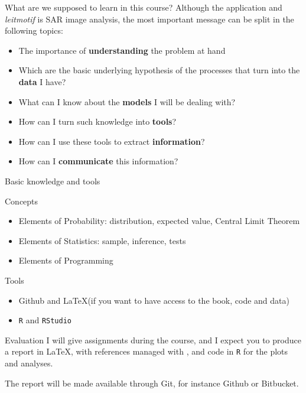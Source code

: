 \documentclass{beamer}
\begin{document}
\begin{frame}{What are we supposed to learn in this course?}
Although the application and \textit{leitmotif} is SAR image analysis, the most important message can be split in the following topics:
\begin{itemize}
\item The importance of \textbf{understanding} the problem at hand
\item Which are the basic underlying hypothesis of the processes that turn into the \textbf{data} I have?
\item What can I know about the \textbf{models} I will be dealing with?
\item How can I turn such knowledge into \textbf{tools}?
\item How can I use these tools to extract \textbf{information}?
\item How can I \textbf{communicate} this information?
\end{itemize}
\end{frame}

\begin{frame}{Basic knowledge and tools}

\begin{alertblock}{Concepts}
\begin{itemize}
\item Elements of Probability: distribution, expected value, Central Limit Theorem
\item Elements of Statistics: sample, inference, tests
\item Elements of Programming
\end{itemize}
\end{alertblock}

\begin{alertblock}{Tools}
\begin{itemize}
\item Github and \LaTeX (if you want to have access to the book, code and data)
\item \texttt R and \texttt{RStudio}
\end{itemize}
\end{alertblock}
\end{frame}

\begin{frame}{Evaluation}
I will give assignments during the course, and I expect you to produce a report in \LaTeX, with references managed with \BibTeX, and code in \texttt R for the plots and analyses.

The report will be made available through Git, for instance Github or Bitbucket.
\end{frame}
\end{document}
